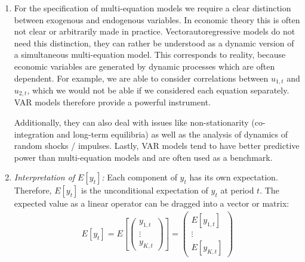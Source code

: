 \begin{enumerate}
\item For the specification of multi-equation models we require a clear distinction between exogenous and endogenous variables.
In economic theory this is often not clear or arbitrarily made in practice.
Vectorautoregressive models do not need this distinction,
  they can rather be understood as a dynamic version of a simultaneous multi-equation model.
This corresponds to reality, because economic variables are generated by dynamic processes which are often dependent.
For example, we are able to consider correlations between \(u_{1,t}\) and \(u_ {2,t}\),
  which we would not be able if we considered each equation separately.
VAR models therefore provide a powerful instrument.

Additionally, they can also deal with issues like non-stationarity (co-integration and long-term equilibria)
  as well as the analysis of dynamics of random shocks / impulses.
 Lastly, VAR models tend to have better predictive power than multi-equation models and are often used as a benchmark.

\item \emph{Interpretation of \(E[y_t]\):}
Each component of \(y_t\) has its own expectation.
Therefore, \(E[y_t]\) is the unconditional expectation of \(y_t\) at period \(t\).
The expected value as a linear operator can be dragged into a vector or matrix:
\begin{align*}
E[y_t] = E\left[\begin{pmatrix}y_{1,t} \\ \vdots \\ y_{K,t} \end{pmatrix} \right]
= \begin{pmatrix}E[y_{1,t}] \\ \vdots \\ E[y_{K,t}] \end{pmatrix}
\end{align*}


\end{enumerate}
